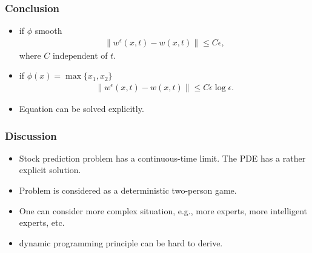 \documentclass{beamer}
\begin{document}
\begin{frame}
\frametitle{Conclusion}
\begin{itemize}
\item if $\phi$ smooth
\begin{align*}
\|w^\epsilon(x,t)-w(x,t)\|\le C\epsilon,
\end{align*}
where $C$ independent of $t$.
\item if $\phi(x) = \max\{x_1,x_2\}$
\begin{align*}
\|w^\epsilon(x,t)-w(x,t)\|\le C\epsilon\log\epsilon.
\end{align*} 
\item Equation can be solved explicitly.
\end{itemize}
\end{frame}



\begin{frame}
\frametitle{Discussion}
\begin{itemize}
\item Stock prediction problem has a continuous-time limit. The PDE has a rather explicit solution. 
\pause
\item Problem is considered as a deterministic two-person game.
\pause
\item One can consider more complex situation, e.g., more experts, more intelligent experts, etc.
\pause
\item dynamic programming principle can be hard to derive.
\end{itemize}
\end{frame}
\end{document}
